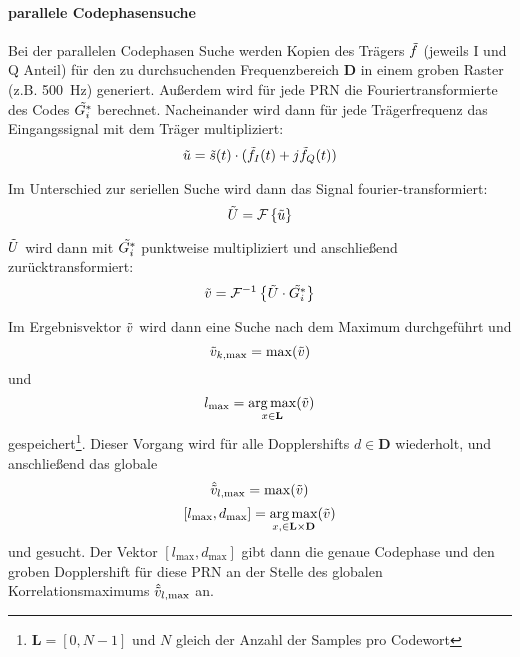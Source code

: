 
\paragraph{parallele Codephasensuche}
Bei der parallelen Codephasen Suche werden Kopien des Trägers $\tilde{f}$ (jeweils I und Q Anteil) für den zu durchsuchenden Frequenzbereich $\textbf{D}$ in einem groben Raster (z.B. \SI{500}{\Hz}) generiert. Außerdem wird für jede PRN die Fouriertransformierte des Codes $\tilde{G_i^*}$ berechnet. Nacheinander wird dann für jede Trägerfrequenz das Eingangssignal mit dem Träger multipliziert:
\begin{equation}
	\tilde{u}=\tilde{s}(t) \cdot (\tilde{f}_I(t) + j \tilde{f}_Q(t))
\end{equation}

Im Unterschied zur seriellen Suche wird dann das Signal  fourier-transformiert:
\begin{equation}
	\tilde{U}=\mathcal{F}\left\{\tilde{u}\right\}
\end{equation}

$\tilde{U}$ wird dann mit $\tilde{G_i^*}$ punktweise multipliziert und anschließend zurücktransformiert: 
\begin{equation}
	\tilde{v}=\mathcal{F}^{-1}\left\{\tilde{U} \cdot \tilde{G_i^*}\right\}
\end{equation}

Im Ergebnisvektor $\tilde{v}$ wird dann eine Suche nach dem Maximum durchgeführt und 
\begin{equation}
	\tilde{v}_{k,\max}=\max(\tilde{v})
\end{equation}
und
\begin{equation}
     l_{\max}=\operatorname*{arg\,max}_{x\in \textbf{L}}(\tilde{v})
\end{equation} 
gespeichert\footnote{$\textbf{L}=[0, N-1]$ und $N$ gleich der Anzahl der Samples pro Codewort}. Dieser Vorgang wird für alle Dopplershifts $d\in \textbf{D}$ wiederholt, und anschließend das globale 
\begin{equation}
	\hat{\tilde{v}}_{l,\max}=\max(\tilde{v})
\end{equation}
\begin{equation}
	\left[l_{\max}, d_{\max}\right]=\operatorname*{arg\,max}_{x,\in \bf{L} \times \bf{D}}(\tilde{v})
\end{equation}
und gesucht. Der Vektor $\left[l_{\max}, d_{\max}\right]$ gibt dann die genaue Codephase und den groben Dopplershift für diese PRN an der Stelle des globalen Korrelationsmaximums $\hat{\tilde{v}}_{l,\max}$ an. 

